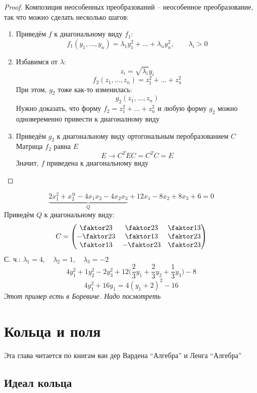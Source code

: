 \begin{proof}
	Композиция неособенных преобразований -- неособенное преобразование, так что можно сделать несколько шагов:
	\begin{enumerate}
		\item Приведём $ f $ к диагональному виду $ f_1 $:
		$$ f_1(y_1, ..., y_n) = \lambda_1y_1^2 + ... + \lambda_ny_n^2, \qquad \lambda_i > 0 $$
		\item Избавимся от $ \lambda $:
		$$ z_i = \sqrt{\lambda_i}y_i $$
		$$ f_2(z_1, ..., z_n) = z_1^2 + ... + z_n^2 $$
		При этом, $ g_2 $ тоже как-то изменилась:
		$$ g_2(z_1, ..., z_n) $$
		Нужно доказать, что форму $ f_2 = z_1^2 + ... + z_n^2 $ и любую форму $ g_2 $ можно одновеременно привести к диагоналному виду
		\item Приведём $ g_2 $ к диагональному виду ортогональным перобразованием $ C $ \\
		Матрица $ f_2 $ равна $ E $
		$$ E \to C^TEC = C^TC = E $$
		Значит, $ f $ приведена к диагональному виду
	\end{enumerate}
\end{proof}

\begin{eg}
	$$ \underbrace{2x_1^2 + x_2^@ - 4x_1x_2 - 4x_2x_3}_{Q} + 12x_1 - 8x_2 + 8x_3 + 6 = 0 $$
	Приведём $ Q $ к диагональному виду:
	$$ C =
	\begin{pmatrix}
		\faktor23 & \faktor23 & \faktor13 \\
		-\faktor23 & \faktor13 & \faktor23 \\
		\faktor13 & -\faktor23 & \faktor23
	\end{pmatrix} $$
	С. ч.: $ \lambda_1 = 4, \quad \lambda_2 = 1, \quad \lambda_3 = -2 $
	$$ 4y_1^2 + 1y_2^2 - 2y_3^2 + 12 \bigg( \frac23 y_1 + \frac23 y_2 + \frac13 y_3 \bigg) - 8 $$
	$$ 4y_1^2 + 16y_1 = 4(y_1 + 2)^2 - 16 $$
	\textit{Этот пример есть в Боревиче. Надо посмотреть}
\end{eg}


\chapter{Кольца и поля}

Эта глава читается по книгам ван дер Вардена ``Алгебра'' и Ленга ``Алгебра''

\section{Идеал кольца}

